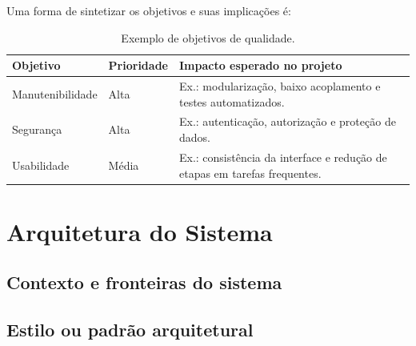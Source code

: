 \documentclass[a4paper,12pt,oneside,openany]{book}
\newif\iforientacoes
\newcommand{\orientacao}[1]{%
    \iforientacoes
        \begin{quote}
        \small\itshape\textbf{Orientação:} #1
        \end{quote}
    \fi
}
\begin{document}
\orientacao{Identifiquem os atributos de qualidade que realmente influenciam
as decisões de projeto, por exemplo: manutenibilidade, desempenho, segurança,
confiabilidade, usabilidade ou portabilidade. Podem ser utilizados modelos
como ISO/IEC 25010 ou FURPS+, desde que apenas os atributos relevantes ao
sistema sejam selecionados.}

Uma forma de sintetizar os objetivos e suas implicações é:

\begin{table}[ht]
\centering
\caption{Exemplo de objetivos de qualidade.}
\begin{tabularx}{0.95\textwidth}{p{} p{} X}
\toprule
\textbf{Objetivo} & \textbf{Prioridade} & \textbf{Impacto esperado no projeto} \\
\midrule
Manutenibilidade & Alta & Ex.: modularização, baixo acoplamento e testes automatizados. \\
Segurança & Alta & Ex.: autenticação, autorização e proteção de dados. \\
Usabilidade & Média & Ex.: consistência da interface e redução de etapas em tarefas frequentes. \\
\bottomrule
\end{tabularx}
\end{table}

\chapter{Arquitetura do Sistema}

\orientacao{Apresentem a arquitetura proposta e justifiquem as principais
decisões. O leitor deve conseguir compreender a estrutura geral do sistema
antes de entrar nos detalhes de seus componentes.}

\section{Contexto e fronteiras do sistema}

\orientacao{Apresentem um diagrama de contexto mostrando o sistema, seus
principais usuários e os sistemas externos com os quais ele se comunica.
Expliquem as relações mostradas no diagrama.}

\section{Estilo ou padrão arquitetural}
\end{document}
